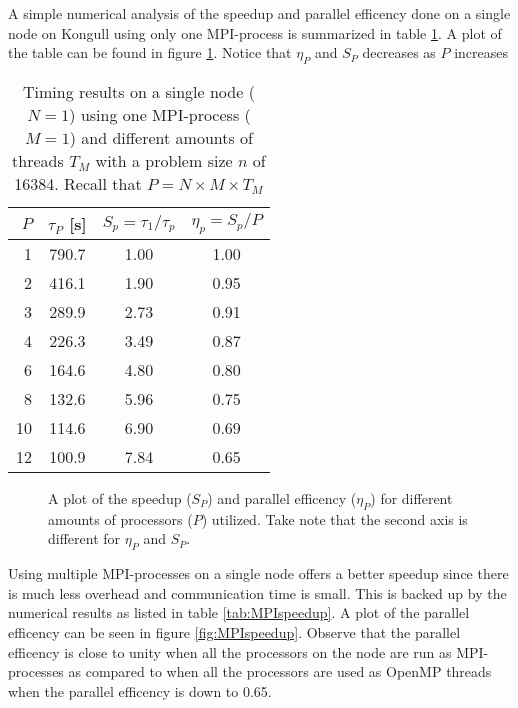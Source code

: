 \documentclass[11pt,a4paper,english]{article}
\numberwithin{figure}{subsection}
\numberwithin{table}{subsection}
\begin{document}
A simple numerical analysis of the speedup and parallel efficency done on a single node on Kongull using only one MPI-process is summarized in table \ref{tab:nodespeedup}. A plot of the table can be found in figure \ref{fig:nodespeed}. Notice that $\eta_P$ and $S_P$ decreases as $P$ increases  
\begin{table}[htbp]
	\label{tab:nodespeedup}
	\caption{Timing results on a single node ($N=1$) using one MPI-process ($M=1$) and different amounts of threads $T_M$ with a problem size $n$ of 16384. Recall that $P=N\times M\times T_M$}
	\centering
	\begin{tabular}{r|c|c|c}
	$P$	&$\tau_P$ [s]	&	$S_p=\tau_1/\tau_p$	&	$\eta_p=S_p/P$	\\
\hline
	1	&	790.7	&	1.00	&	1.00	\\
	2	&	416.1	&	1.90	&	0.95	\\
	3	&	289.9	&	2.73	&	0.91	\\
	4	&	226.3	&	3.49	&	0.87	\\
	6	&	164.6	&	4.80	&	0.80	\\
	8	&	132.6	&	5.96	&	0.75	\\
	10	&	114.6	&	6.90	&	0.69	\\
	12	&	100.9	&	7.84	&	0.65	\\
	\end{tabular}
\end{table}

\begin{figure}[htbp]
	\label{fig:nodespeed}
	\centering
	
	\caption{A plot of the speedup ($S_P$) and parallel efficency ($\eta_P$) for different amounts of processors ($P$) utilized. Take note that the second axis is different for $\eta_P$ and $S_P$.}
\end{figure}

Using multiple MPI-processes on a single node offers a better speedup since there is much less overhead and communication time is small. This is backed up by the numerical results as listed in table \ref{tab:MPIspeedup}. A plot of the parallel efficency can be seen in figure \ref{fig:MPIspeedup}. Observe that the parallel efficency is close to unity when all the processors on the node are run as MPI-processes as compared to when all the processors are used as OpenMP threads when the parallel efficency is down to 0.65.
\end{document}

